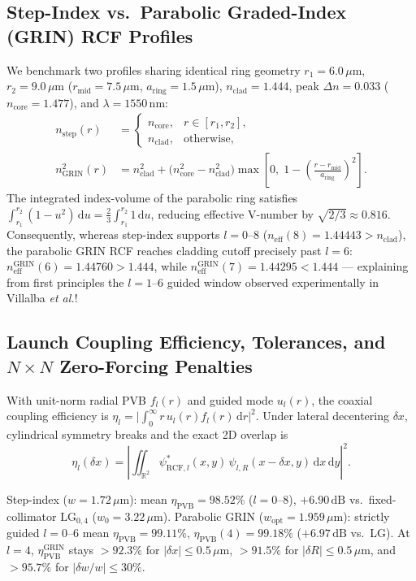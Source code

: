 \documentclass[10pt,letterpaper]{article}
\newcommand{\abs}[1]{\lvert #1 \rvert}
\newcommand{\dd}{\mathrm{d}}
\numberwithin{equation}{section}
\begin{document}
\subsection{Step-Index vs.\ Parabolic Graded-Index (GRIN) RCF Profiles}
We benchmark two profiles sharing identical ring geometry $r_1 = 6.0\,\mu\mathrm{m}$, $r_2 = 9.0\,\mu\mathrm{m}$ ($r_{\mathrm{mid}} = 7.5\,\mu\mathrm{m}$, $a_{\mathrm{ring}} = 1.5\,\mu\mathrm{m}$), $n_{\mathrm{clad}} = 1.444$, peak $\Delta n = 0.033$ ($n_{\mathrm{core}} = 1.477$), and $\lambda = 1550\,\mathrm{nm}$:
\begin{align}
  n_{\mathrm{step}}(r) &= \begin{cases} n_{\mathrm{core}}, & r \in [r_1, r_2], \\ n_{\mathrm{clad}}, & \text{otherwise}, \end{cases} \\
  n_{\mathrm{GRIN}}^2(r) &= n_{\mathrm{clad}}^2 + \bigl(n_{\mathrm{core}}^2 - n_{\mathrm{clad}}^2\bigr)\max\!\left[0,\; 1 - \left(\frac{r - r_{\mathrm{mid}}}{a_{\mathrm{ring}}}\right)^2\right].
\end{align}
The integrated index-volume of the parabolic ring satisfies $\int_{r_1}^{r_2} (1 - u^2)\,\dd u = \frac{2}{3}\int_{r_1}^{r_2} 1\,\dd u$, reducing effective V-number by $\sqrt{2/3} \approx 0.816$. Consequently, whereas step-index supports $l = 0\text{--}8$ ($n_{\mathrm{eff}}(8) = 1.44443 > n_{\mathrm{clad}}$), the parabolic GRIN RCF reaches cladding cutoff precisely past $l = 6$: $n_{\mathrm{eff}}^{\mathrm{GRIN}}(6) = 1.44760 > 1.444$, while $n_{\mathrm{eff}}^{\mathrm{GRIN}}(7) = 1.44295 < 1.444$ --- explaining from first principles the $l = 1\text{--}6$ guided window observed experimentally in Villalba \emph{et al.}!

\subsection{Launch Coupling Efficiency, Tolerances, and $N\times N$ Zero-Forcing Penalties}
With unit-norm radial PVB $f_l(r)$ and guided mode $u_l(r)$, the coaxial coupling efficiency is $\eta_l = \abs{\int_0^\infty r\,u_l(r) f_l(r)\,\dd r}^2$. Under lateral decentering $\delta x$, cylindrical symmetry breaks and the exact 2D overlap is
\begin{equation}
  \eta_l(\delta x) = \left|\iint_{\mathbb{R}^2} \psi_{\mathrm{RCF},l}^*(x,y)\,\psi_{l,R}(x-\delta x, y)\,\dd x\,\dd y\right|^2.
\end{equation}
\begin{pencheck}
Step-index ($w=1.72\,\mu\mathrm{m}$): mean $\eta_{\mathrm{PVB}} = 98.52\%$ ($l=0\text{--}8$), $+6.90\,\mathrm{dB}$ vs.\ fixed-collimator $\mathrm{LG}_{0,4}$ ($w_0=3.22\,\mu\mathrm{m}$). Parabolic GRIN ($w_{\mathrm{opt}} = 1.959\,\mu\mathrm{m}$): strictly guided $l=0\text{--}6$ mean $\eta_{\mathrm{PVB}} = \mathbf{99.11\%}$, $\eta_{\mathrm{PVB}}(4) = 99.18\%$ ($+6.97\,\mathrm{dB}$ vs.\ LG). At $l=4$, $\eta_{\mathrm{PVB}}^{\mathrm{GRIN}}$ stays $>92.3\%$ for $\abs{\delta x}\le 0.5\,\mu\mathrm{m}$, $>91.5\%$ for $\abs{\delta R}\le 0.5\,\mu\mathrm{m}$, and $>95.7\%$ for $\abs{\delta w/w}\le 30\%$.
\end{pencheck}
\end{document}
